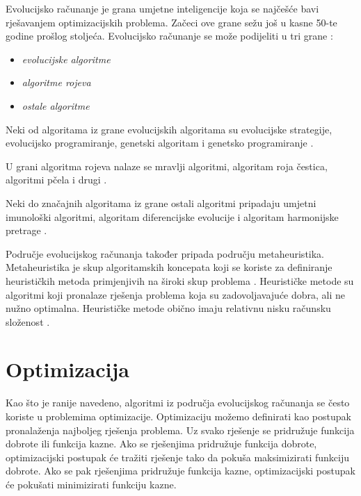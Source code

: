 \documentclass[zavrsnirad]{fer}
\begin{document}
	Evolucijsko računanje je grana umjetne inteligencije koja se najčešće bavi rješavanjem optimizacijskih problema. Začeci ove grane sežu još u kasne 50-te godine prošlog stoljeća. Evolucijsko računanje se može podijeliti u tri grane \cite{skriptaEvolucijskoRacunarstvo}: 
	\begin{itemize}
		\item \textit{evolucijske algoritme}
		\item \textit{algoritme rojeva}
		\item \textit{ostale algoritme}
	\end{itemize}
	
	Neki od algoritama iz grane evolucijskih algoritama su evolucijske strategije, evolucijsko programiranje, genetski algoritam i genetsko programiranje \cite{skriptaEvolucijskoRacunarstvo}.
	
	U grani algoritma rojeva nalaze se mravlji algoritmi, algoritam roja čestica, algoritmi pčela i drugi \cite{skriptaEvolucijskoRacunarstvo}.
	
	Neki do značajnih algoritama iz grane ostali algoritmi pripadaju umjetni imunološki algoritmi, algoritam diferencijske evolucije i algoritam harmonijske pretrage \cite{skriptaEvolucijskoRacunarstvo}.
	
	Područje evolucijskog računanja također pripada području metaheuristika. Metaheuristika je skup algoritamskih koncepata koji se koriste za definiranje heurističkih metoda primjenjivih na široki skup problema \cite{skriptaEvolucijskoRacunarstvo}. Heurističke metode su algoritmi koji pronalaze rješenja problema koja su zadovoljavajuće dobra, ali ne nužno optimalna. Heurističke metode obično imaju relativnu nisku računsku složenost \cite{skriptaEvolucijskoRacunarstvo}.

	\section{Optimizacija}
	\label{pog:Optimizacija}
	
		Kao što je ranije navedeno, algoritmi iz područja evolucijskog računanja se često koriste u problemima optimizacije. Optimizaciju možemo definirati kao postupak pronalaženja najboljeg rješenja problema. Uz svako rješenje se pridružuje funkcija dobrote ili funkcija kazne. Ako se rješenjima pridružuje funkcija dobrote, optimizacijski postupak će tražiti rješenje tako da pokuša maksimizirati funkciju dobrote. Ako se pak rješenjima pridružuje funkcija kazne, optimizacijski postupak će pokušati minimizirati funkciju kazne.\cite{skriptaEvolucijskoRacunarstvo}
\end{document}
